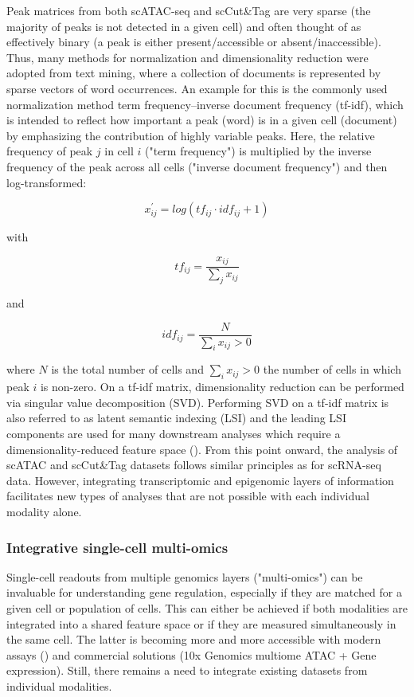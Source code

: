 Peak matrices from both scATAC-seq and scCut\&Tag are very sparse (the majority of peaks is not detected in a given cell) and often thought of as effectively binary (a peak is either present/accessible or absent/inaccessible). Thus, many methods for normalization and dimensionality reduction were adopted from text mining, where a collection of documents is represented by sparse vectors of word occurrences. An example for this is the commonly used normalization method term frequency–inverse document frequency (tf-idf), which is intended to reflect how important a peak (word) is in a given cell (document) by emphasizing the contribution of highly variable peaks. Here, the relative frequency of peak $j$ in cell $i$ ("term frequency") is multiplied by the inverse frequency of the peak across all cells ("inverse document frequency") and then log-transformed:

\[ x^{\prime}_{ij} = log(tf_{ij} \cdot idf_{ij} + 1) \]

with

\[ tf_{ij} = \frac{x_{ij}} {\sum_{j}{x_{ij}}} \]

and 

\[ idf_{ij} = \frac{N}{\sum_{i}{x_{ij} > 0}} \]

where $N$ is the total number of cells and $\sum_{i}{x_{ij} > 0}$ the number of cells in which peak $i$ is non-zero. On a tf-idf matrix, dimensionality reduction can be performed via singular value decomposition (SVD). Performing SVD on a tf-idf matrix is also referred to as latent semantic indexing (LSI) and the leading LSI components are used for many downstream analyses which require a dimensionality-reduced feature space (\cite{stuart_comprehensive_2019}). From this point onward, the analysis of scATAC and scCut\&Tag datasets follows similar principles as for scRNA-seq data. However, integrating transcriptomic and epigenomic layers of information facilitates new types of analyses that are not possible with each individual modality alone.



\subsubsection{Integrative single-cell multi-omics}

Single-cell readouts from multiple genomics layers ("multi-omics") can be invaluable for understanding gene regulation, especially if they are matched for a given cell or population of cells. This can either be achieved if both modalities are integrated into a shared feature space or if they are measured simultaneously in the same cell. The latter is becoming more and more accessible with modern assays (\cite{ma_chromatin_2020,bartosovic_multimodal_2022}) and commercial solutions (10x Genomics multiome ATAC + Gene expression). Still, there remains a need to integrate existing datasets from individual modalities.


